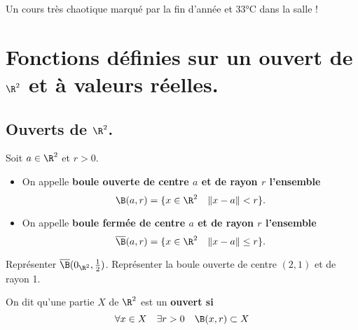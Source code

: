 \documentclass[11pt]{article}
\begin{document}


\begin{center}
    \Large Un cours très chaotique marqué par la fin d'année et 33°C dans la salle !
\end{center}

\section{Fonctions définies sur un ouvert de \texorpdfstring{$\R^2$}{Lg} et à valeurs réelles.}

\subsection{Ouverts de \texorpdfstring{$\R^2$}{Lg}.}

\begin{defi}{}{}
    Soit $a\in\R^2$ et $r>0$.
    \begin{itemize}[topsep=0pt,itemsep=-0.9 ex]
        \item On appelle \bf{boule ouverte} de centre $a$ et de rayon $r$ l'ensemble
        \begin{equation*}
            \B(a,r)=\{x\in\R^2\quad\|x-a\|<r\}.
        \end{equation*}
        \item On appelle \bf{boule fermée} de centre $a$ et de rayon $r$ l'ensemble
        \begin{equation*}
            \overline{\B}(a,r)=\{x\in\R^2\quad\|x-a\|\leq r\}.
        \end{equation*}
    \end{itemize}
\end{defi}

\begin{ex}{}{}
    Représenter $\overline{\B}(0_{\R^2},\frac{1}{2})$. Représenter la boule ouverte de centre $(2,1)$ et de rayon 1.
\end{ex}

\begin{defi}{}{}
    On dit qu'une partie $X$ de $\R^2$ est un \bf{ouvert} si
    \begin{equation*}
        \forall x \in X \quad \exists r > 0 \quad \B(x,r) \subset X
    \end{equation*}
\end{defi}
\end{document}
